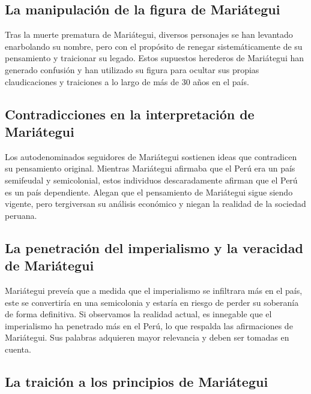 \documentclass[
  a4paper,
]{article}
\begin{document}
\hypertarget{la-manipulaciuxf3n-de-la-figura-de-mariuxe1tegui}{%
\subsection{La manipulación de la figura de
Mariátegui}\label{la-manipulaciuxf3n-de-la-figura-de-mariuxe1tegui}}

Tras la muerte prematura de Mariátegui, diversos personajes se han
levantado enarbolando su nombre, pero con el propósito de renegar
sistemáticamente de su pensamiento y traicionar su legado. Estos
supuestos herederos de Mariátegui han generado confusión y han utilizado
su figura para ocultar sus propias claudicaciones y traiciones a lo
largo de más de 30 años en el país.

\hypertarget{contradicciones-en-la-interpretaciuxf3n-de-mariuxe1tegui}{%
\subsection{Contradicciones en la interpretación de
Mariátegui}\label{contradicciones-en-la-interpretaciuxf3n-de-mariuxe1tegui}}

Los autodenominados seguidores de Mariátegui sostienen ideas que
contradicen su pensamiento original. Mientras Mariátegui afirmaba que el
Perú era un país semifeudal y semicolonial, estos individuos
descaradamente afirman que el Perú es un país dependiente. Alegan que el
pensamiento de Mariátegui sigue siendo vigente, pero tergiversan su
análisis económico y niegan la realidad de la sociedad peruana.

\hypertarget{la-penetraciuxf3n-del-imperialismo-y-la-veracidad-de-mariuxe1tegui}{%
\subsection{La penetración del imperialismo y la veracidad de
Mariátegui}\label{la-penetraciuxf3n-del-imperialismo-y-la-veracidad-de-mariuxe1tegui}}

Mariátegui preveía que a medida que el imperialismo se infiltrara más en
el país, este se convertiría en una semicolonia y estaría en riesgo de
perder su soberanía de forma definitiva. Si observamos la realidad
actual, es innegable que el imperialismo ha penetrado más en el Perú, lo
que respalda las afirmaciones de Mariátegui. Sus palabras adquieren
mayor relevancia y deben ser tomadas en cuenta.

\hypertarget{la-traiciuxf3n-a-los-principios-de-mariuxe1tegui}{%
\subsection{La traición a los principios de
Mariátegui}\label{la-traiciuxf3n-a-los-principios-de-mariuxe1tegui}}
\end{document}
